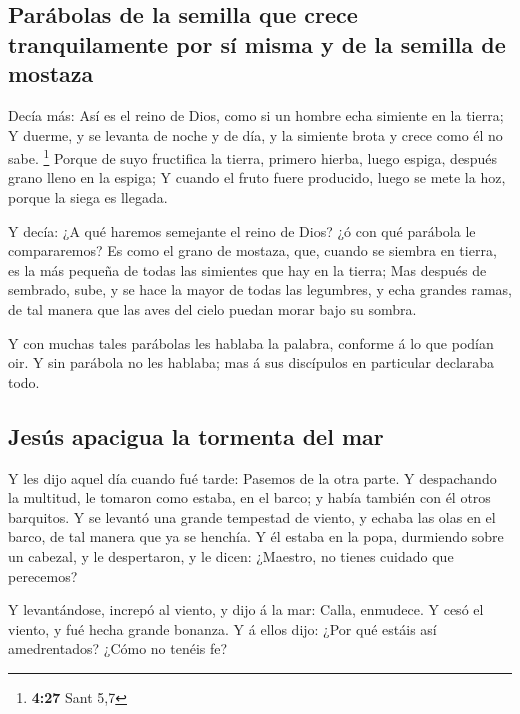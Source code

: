\hypertarget{paruxe1bolas-de-la-semilla-que-crece-tranquilamente-por-suxed-misma-y-de-la-semilla-de-mostaza}{%
\subsection{Parábolas de la semilla que crece tranquilamente por sí
misma y de la semilla de
mostaza}\label{paruxe1bolas-de-la-semilla-que-crece-tranquilamente-por-suxed-misma-y-de-la-semilla-de-mostaza}}

 Decía más: Así es el reino de Dios, como si un hombre
echa simiente en la tierra;  Y duerme, y se levanta de
noche y de día, y la simiente brota y crece como él no sabe. \footnote{\textbf{4:27}
  Sant 5,7}  Porque de suyo fructifica la tierra, primero
hierba, luego espiga, después grano lleno en la espiga; 
Y cuando el fruto fuere producido, luego se mete la hoz, porque la siega
es llegada.

 Y decía: ¿A qué haremos semejante el reino de Dios? ¿ó
con qué parábola le compararemos?  Es como el grano de
mostaza, que, cuando se siembra en tierra, es la más pequeña de todas
las simientes que hay en la tierra;  Mas después de
sembrado, sube, y se hace la mayor de todas las legumbres, y echa
grandes ramas, de tal manera que las aves del cielo puedan morar bajo su
sombra.

 Y con muchas tales parábolas les hablaba la palabra,
conforme á lo que podían oir.  Y sin parábola no les
hablaba; mas á sus discípulos en particular declaraba todo.

\hypertarget{jesuxfas-apacigua-la-tormenta-del-mar}{%
\subsection{Jesús apacigua la tormenta del
mar}\label{jesuxfas-apacigua-la-tormenta-del-mar}}

 Y les dijo aquel día cuando fué tarde: Pasemos de la
otra parte.  Y despachando la multitud, le tomaron como
estaba, en el barco; y había también con él otros barquitos.
 Y se levantó una grande tempestad de viento, y echaba
las olas en el barco, de tal manera que ya se henchía.  Y
él estaba en la popa, durmiendo sobre un cabezal, y le despertaron, y le
dicen: ¿Maestro, no tienes cuidado que perecemos?

 Y levantándose, increpó al viento, y dijo á la mar:
Calla, enmudece. Y cesó el viento, y fué hecha grande bonanza.
 Y á ellos dijo: ¿Por qué estáis así amedrentados? ¿Cómo
no tenéis fe?

